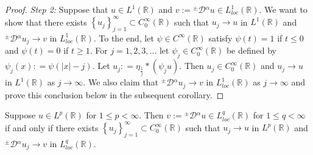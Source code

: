 \documentclass[leqno,final]{siamltex}
\numberwithin{equation}{section}
\renewcommand{\(}{\bigl(}
\renewcommand{\)}{\bigr)}
\newcommand{\R}{\mathbb{R}}
\begin{document}
\begin{proof}
            \smallskip
            {\em Step 2:} Suppose that $u \in L^{1}(\R)$ and $v := {^{\pm}}{\mathcal{D}}{^{\alpha}} u 
            \in L^{1}_{loc}(\R)$. We want to show that there exists $\left\{ u_j 
             \right\}_{j=1}^{\infty} \subset C^{\infty}_{0}(\R)$ such that $u_j \rightarrow u$ in $L^{1}(\R)$
             and ${^{\pm}}{\mathcal{D}}{^{\alpha}} u_j \rightarrow v$ in $L^{1}_{loc}(\R)$. 
            To the end, let $\psi \in C^{\infty}(\R)$ satisfy $\psi(t) =1$ if $t \leq 0$ and $\psi (t) = 0$ if 
            $t \geq 1$. For $j =1 ,2,3,...$ let $\psi_{j} \in C^{\infty}_{0}(\R)$ be defined by 
            $\psi_{j}(x) : = \psi(|x| - j)$. Let $u_j : =\eta_{\frac{1}{j}} * (\psi_{j}u)$. Then $u_j\in C^\infty_0(\R)$ and $u_j \rightarrow u$ in $L^{1}(\R)$ as $j \rightarrow \infty$.
            We also claim that ${^{\pm}}{\mathcal{D}}{^{\alpha}} u_j \rightarrow v$ in $L^{1}_{loc}(\R)$  as
            $j\to \infty$ and prove this conclusion below in the subsequent corollary.
       \end{proof}
   
   \medskip
   \begin{corollary}\label{corollary4.8}
   	Suppose $u \in L^{p}(\R)$ for $1 \leq p < \infty$. Then $v := {^{\pm}}{\mathcal{D}}{^{\alpha}} u \in L^{q}_{loc}(\R)$
   	for $1\leq q <\infty$ 
   	if and only if there exists $\left\{u_j \right\}_{j=1}^{\infty} \subset C^{\infty}_{0}(\R)$ such that $u_j \rightarrow u$ in $L^{p}(\R)$ and ${^{\pm}}{\mathcal{D}}{^{\alpha}} u_j \rightarrow v$ in $L^{q}_{loc}(\R)$.
   \end{corollary}
\end{document}
